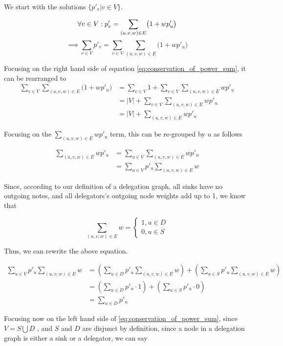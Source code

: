 We start with the solutions $\{p'_v | v \in V\}$.

\[
\forall v \in V: p'_v = \sum_{(u, v, w) \in E} \bigl( 1 + wp'_u \bigr) \\
\]
\begin{equation} \label{eq:conservation_of_power_sum}
\implies \sum_{v \in V} p'_v = \sum_{v \in V} \sum_{(u, v, w) \in E} \bigl( 1 + wp'_u \bigr)
\end{equation}

Focusing on the right hand side of equation \ref{eq:conservation_of_power_sum}, it can be rearranged to
\begin{align*}
\sum_{v \in V} \sum_{(u, v, w) \in E} \bigl( 1 + wp'_u \bigr) &= \sum_{v \in V} 1 + \sum_{v \in V} \sum_{(u, v, w) \in E} wp'_u \\
&= |V| + \sum_{v \in V} \sum_{(u, v, w) \in E} wp'_u \\
&= |V| + \sum_{(u, v, w) \in E} wp'_u
\end{align*}

Focusing on the $\sum_{(u, v, w) \in E} wp'_u$ term, this can be re-grouped by $u$ as follows 

\begin{align*}
\sum_{(u, v, w) \in E} wp'_u &= \sum_{u \in V} \sum_{(u, v, w) \in E} wp'_u \\
&= \sum_{u \in V} p'_u  \sum_{(u, v, w) \in E} w
\end{align*}

Since, according to our definition of a delegation graph, all sinks have no outgoing notes, and all delegators's outgoing node weights add up to 1, we know that

\[
\sum_{(u, v, w) \in E} w = \begin{cases} 1, u \in D \\ 0, u \in S \end{cases}
\]

Thus, we can rewrite the above equation.

\begin{align*}
\sum_{u \in V} p'_u  \sum_{(u, v, w) \in E} w &= \left(\sum_{u \in D} p'_u  \sum_{(u, v, w) \in E} w \right) + \left( \sum_{u \in S} p'_u  \sum_{(u, v, w) \in E} w \right) \\
&= \left( \sum_{u \in D} p'_u \cdot 1 \right) + \left(\sum_{u \in S} p'_u \cdot 0 \right) \\
&= \sum_{u \in D} p'_u
\end{align*}

Focusing now on the left hand side of \ref{eq:conservation_of_power_sum}, since $V = S \bigcup D$ , and $S$ and $D$ are disjunct by definition, since a node in a delegation graph is either a sink or a delegator, we can say

